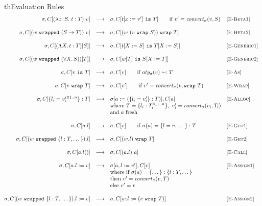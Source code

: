 \documentclass{article}
\newcommand{\fun}[1]{\mbox{\it #1\/}}
\newcommand{\lam}[4]{\lambda#1\!:\!#2.\,\,#4:#3}
\newcommand{\lamt}[2]{#1\rightarrow #2}
\newcommand{\app}[2]{#1~#2}
\newcommand{\Lam}[3]{\Lambda #1.\,#2:#3}
\newcommand{\App}[2]{#1[#2]}
\newcommand{\Forall}[2]{\forall #1.\,#2}
\newcommand{\cast}[2]{#1~\t{is}~#2}
\newcommand{\convert}[2]{{#1}\convertword{#2}}
\newcommand{\convertword}{\mbox{\,\,$\sim :$\,\,}}
\renewcommand{\t}[1]{{\tt #1}}
\newcommand{\red}[0]{\longrightarrow}  %
\newcommand{\lred}[0]{\red}  %
\newcommand{\objty}[1]{\{#1\}}
\newcommand{\obje}[2]{\{#1\}:{#2}}
\newcommand{\objget}[2]{#1.#2}
\newcommand{\objcall}[2]{#1.#2()}
\newcommand{\objset}[3]{#1.#2:=#3}
\newcommand{\wrapty}[1]{\t{wrap}~#1}
\newcommand{\wrapv}[2]{#1~\t{wrapped}~#2}
\newcommand{\wrap}[2]{#1~\t{wrap}~#2}
\newcommand{\compatible}[2]{#1 \sim: #2 }
\newcommand{\allocty}[1]{aty_{\sigma}(#1)}
\renewcommand{\convert}[2]{\fun{convert}_{\sigma}(#1,#2)}
\begin{document}
\begin{displayfigure}{th}{Evaluation Rules}
\label{fig:eval} 
\footnotesize
\[
\begin{array}{@{}rcllr}
	\sigma,C[{\app{(\lam{x}{S}{T}{t})}{v}}]
	&\lred&
	\sigma,C[\cast{t[x:=v']}{T}]
	\qquad\mbox{if $v'=\convert v S$}
	&\rel{E-Beta1}
\\~\\
	\sigma,C[{\app{(\wrapv{w}{(\lamt{S}{T})})}
	              {v}}]
	&\lred&
	\sigma,C[\wrap{(w~(\wrap{v}{S}))}{T}]
	&\rel{E-Beta2}
\\~\\
	\sigma,C[{\App{(\Lam{X}{t}{T})}{S}}]
	&\lred&
	\sigma,C[\cast{t[X:=S]}{T[X:=S]}]
	&\rel{E-Generic1}
\\~\\
	\sigma,C[{\App{(\wrapv{w}{(\Forall{X}{S})})}
		          {T}}]
	&\lred&
	\sigma,C[\cast{\App{w}{T}}{S[X:=T]}]
	&\rel{E-Generic2}
\\~\\
	\sigma,C[\cast{v}{T}]
	&\lred&
	\sigma,C[v]
	\qquad\mbox{if $\compatible{\allocty v}{T}$}
	&\rel{E-As}
\\~\\
	\sigma,C[\wrap{v}{T}]
	&\lred& 
	\sigma,C[v']
	\qquad\mbox{if $v'=\convert v {\wrapty T}$}
 	&\rel{E-Wrap} 
\\~\\
	\sigma,C[\obje{l_i=v_i^{i\in 1..n}}{T}]
	&\lred&
	\sigma[a:=(\obje{l_i=v'_i}{T})],C[a] 
	&\rel{E-Alloc} \\
	&&\mbox{where }T=\objty{l_i:T_i^{i\in 1..n}}, ~v'_i=\convert{v_i}{T_i} \\
	&&\mbox{and $a$ fresh}
\\~\\
	\sigma,C[\objget{a}{l}]
	&\lred&
	\sigma,C[v]
	\qquad\mbox{if $\sigma(a)=\obje{l=v,\dots}{T}$}
	&\rel{E-Get1}
\\~\\
	\sigma,C[\objget{(\wrapv{w}{\objty{l:T,\dots}})}{l}]
	&\lred&
	\sigma,C[\wrap{(\objget{w}{l})}{T}] 
	&\rel{E-Get2}
\\~\\
	\sigma,C[\objcall{a}{l}]
	&\lred&
	\sigma,C[\app{(\objget a l)} a]
	&\rel{E-Call}
\\~\\
	\sigma,C[\objset{a}{l}{v}]
	&\lred&
	\sigma[a,l:=v'],C[v] 
	&\rel{E-Assign1} \\
	&&\mbox{where if $\sigma(a)=\obje{\dots}{\objty{l:T,\dots}}$ }\\
	&&\mbox{then $v'=\convert{v}{T}$} \\
	&&\mbox{else $v'=v$} 
\\~\\
	\sigma,C[\objset{(\wrapv{w}{\objty{l:T,\dots}})}{l}{v}]
	&\lred&
	\sigma,C[\objset{w}{l}{(\wrap{v}{T})}]
	&\rel{E-Assign2} \\
\end{array}
\]
\end{displayfigure}
\end{document}
